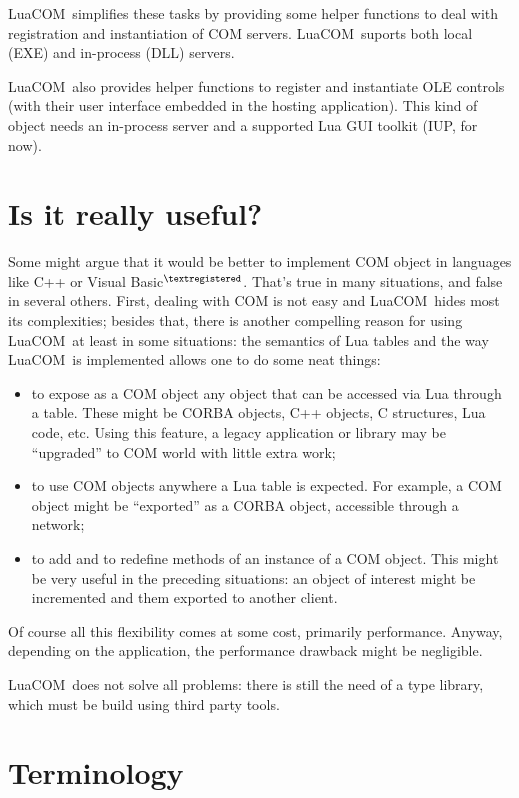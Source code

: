 \documentclass[11pt,a4paper,english]{report}
\newcommand{\techname}[1]{\mbox{#1}}
\newcommand{\luacom}{\techname{LuaCOM}}
\newcommand{\registered}{$^{\textregistered}$}
\begin{document}
\luacom\ simplifies these tasks by providing some helper functions to
deal with registration and instantiation of COM servers. \luacom\ suports
both local (EXE) and in-process (DLL) servers.

\luacom\ also provides helper functions to register and instantiate
OLE controls (with their user interface embedded in the hosting
application). This kind of object needs an in-process server and a
supported Lua GUI toolkit (IUP, for now).

\section{Is it really useful?}
Some might argue that it would be better to implement COM object in
languages like C++ or Visual Basic\registered . That's true in many
situations, and false in several others. First, dealing with COM is
not easy and \luacom\ hides most its complexities; besides that, there
is another compelling reason for using \luacom\, at least in some
situations: the semantics of Lua tables and the way \luacom\ is
implemented allows one to do some neat things:

\begin{itemize}
\item to expose as a COM object any object that can be accessed via
Lua through a table. These might be CORBA objects, C++ objects, C
structures, Lua code, etc. Using this feature, a legacy application or
library may be ``upgraded'' to COM world with little extra work;

\item to use COM objects anywhere a Lua table is expected. For
example, a COM object might be ``exported'' as a CORBA object,
accessible through a network;

\item to add and to redefine methods of an instance of a COM
object. This might be very useful in the preceding situations: an
object of interest might be incremented and them exported to another
client.

\end{itemize}

Of course all this flexibility comes at some cost, primarily
performance. Anyway, depending on the application, the performance
drawback might be negligible.

\luacom\ does not solve all problems: there is still the need of a
type library, which must be build using third party tools.


\section{Terminology}
\end{document}
